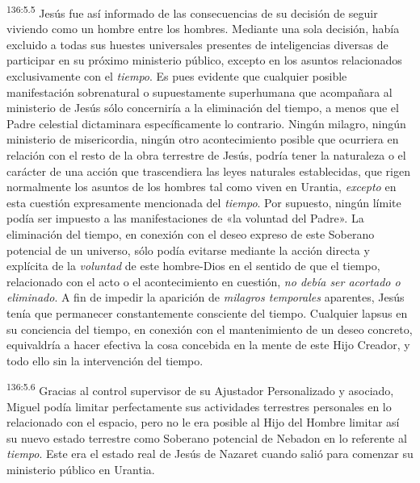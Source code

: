 \par 
\textsuperscript{136:5.5} Jesús fue así informado de las consecuencias de su decisión de seguir viviendo como un hombre entre los hombres. Mediante una sola decisión, había excluido a todas sus huestes universales presentes de inteligencias diversas de participar en su próximo ministerio público, excepto en los asuntos relacionados exclusivamente con el \textit{tiempo}. Es pues evidente que cualquier posible manifestación sobrenatural o supuestamente superhumana que acompañara al ministerio de Jesús sólo concerniría a la eliminación del tiempo, a menos que el Padre celestial dictaminara específicamente lo contrario. Ningún milagro, ningún ministerio de misericordia, ningún otro acontecimiento posible que ocurriera en relación con el resto de la obra terrestre de Jesús, podría tener la naturaleza o el carácter de una acción que trascendiera las leyes naturales establecidas, que rigen normalmente los asuntos de los hombres tal como viven en Urantia, \textit{excepto} en esta cuestión expresamente mencionada del \textit{tiempo}. Por supuesto, ningún límite podía ser impuesto a las manifestaciones de «la voluntad del Padre». La eliminación del tiempo, en conexión con el deseo expreso de este Soberano potencial de un universo, sólo podía evitarse mediante la acción directa y explícita de la \textit{voluntad} de este hombre-Dios en el sentido de que el tiempo, relacionado con el acto o el acontecimiento en cuestión, \textit{no debía ser acortado o eliminado}. A fin de impedir la aparición de \textit{milagros temporales} aparentes, Jesús tenía que permanecer constantemente consciente del tiempo. Cualquier lapsus en su conciencia del tiempo, en conexión con el mantenimiento de un deseo concreto, equivaldría a hacer efectiva la cosa concebida en la mente de este Hijo Creador, y todo ello sin la intervención del tiempo.

\par 
\textsuperscript{136:5.6} Gracias al control supervisor de su Ajustador Personalizado y asociado, Miguel podía limitar perfectamente sus actividades terrestres personales en lo relacionado con el espacio, pero no le era posible al Hijo del Hombre limitar así su nuevo estado terrestre como Soberano potencial de Nebadon en lo referente al \textit{tiempo}. Este era el estado real de Jesús de Nazaret cuando salió para comenzar su ministerio público en Urantia.


